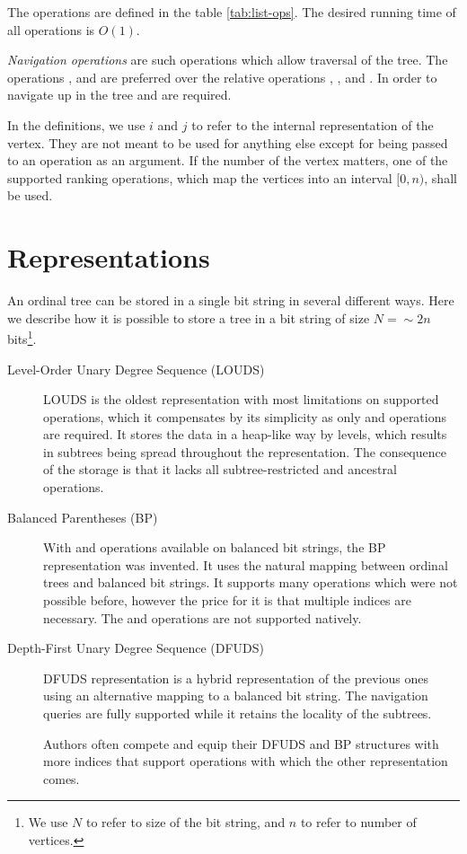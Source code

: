 The operations are defined in the table \ref{tab:list-ops}.
The desired running time of all operations is $O(1)$.

\emph{Navigation operations} are such operations which allow traversal of the tree.
The operations \childRank{}, \childSelect{} and \degree{} are preferred over the relative operations \childPrev{}, \childNext{}, \childFirst{} and \childLast{}.
In order to navigate up in the tree \parent{} and \isRoot{} are required.

In the definitions, we use $i$ and $j$ to refer to the internal representation of the vertex.
They are not meant to be used for anything else except for being passed to an operation as an argument.
If the number of the vertex matters, one of the supported ranking operations, which map the vertices into an interval $[0, n)$, shall be used.

\section{Representations}

An ordinal tree can be stored in a single bit string in several different ways.
Here we describe how it is possible to store a tree in a bit string of size $N = \sim 2n$ bits\footnote{
	We use $N$ to refer to size of the bit string, and $n$ to refer to number of vertices.
}.
\begin{description}
	\item[Level-Order Unary Degree Sequence (LOUDS)]
	LOUDS is the oldest representation with most limitations on supported operations, which it compensates by its simplicity as only \rank{} and \select{} operations are required.
	It stores the data in a heap-like way by levels, which results in subtrees being spread throughout the representation.
	The consequence of the storage is that it lacks all subtree-restricted and ancestral operations.
	
	\item[Balanced Parentheses (BP)]
	With \match{} and \enclose{} operations available on balanced bit strings, the BP representation was invented.
	It uses the natural mapping between ordinal trees and balanced bit strings.
	It supports many operations which were not possible before, however the price for it is that multiple indices are necessary.
	The \childRank{} and \childSelect{} operations are not supported natively.
	
	\item[Depth-First Unary Degree Sequence (DFUDS)]
	DFUDS representation is a hybrid representation of the previous ones using an alternative mapping to a balanced bit string.
	The navigation queries are fully supported while it retains the locality of the subtrees.
	
	Authors often compete and equip their DFUDS and BP structures with more indices that support operations with which the other representation comes.
\end{description}

